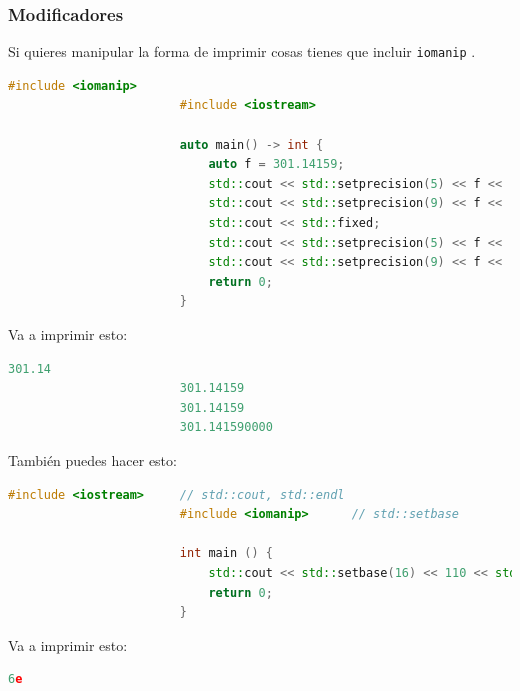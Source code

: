 \documentclass[12pt, fleqn]{report}                             %
\theoremstyle{break}                                            %
\newcommand{\textCode}[1]  { \texttt{#1} }                      %
\begin{document}
                \subsubsection{Modificadores}

                    Si quieres manipular la forma de imprimir cosas tienes que incluir 
                    \textCode{iomanip}. 

                    \begin{lstlisting}[language=C++, gobble=24]
                        #include <iomanip>
                        #include <iostream>

                        auto main() -> int {
                            auto f = 301.14159;
                            std::cout << std::setprecision(5) << f << '\n';
                            std::cout << std::setprecision(9) << f << '\n';
                            std::cout << std::fixed;
                            std::cout << std::setprecision(5) << f << '\n';
                            std::cout << std::setprecision(9) << f << '\n';
                            return 0;
                        }
                    \end{lstlisting}

                    Va a imprimir esto:
                    \begin{lstlisting}[language=C++, gobble=24]
                        301.14
                        301.14159
                        301.14159
                        301.141590000
                    \end{lstlisting}

                    También puedes hacer esto:
                    \begin{lstlisting}[language=C++, gobble=24]
                        #include <iostream>     // std::cout, std::endl
                        #include <iomanip>      // std::setbase

                        int main () {
                            std::cout << std::setbase(16) << 110 << std::endl;
                            return 0;
                        }
                    \end{lstlisting}

                    Va a imprimir esto:
                    \begin{lstlisting}[language=C++, gobble=24]
                        6e
                    \end{lstlisting}
\end{document}
